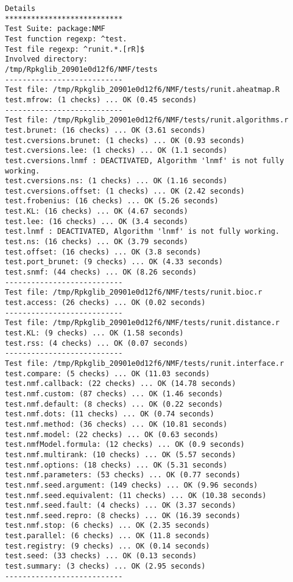 \documentclass[10pt]{article}\usepackage[]{graphicx}\usepackage[]{color}
\begin{document}
\begin{verbatim}
Details 
*************************** 
Test Suite: package:NMF 
Test function regexp: ^test. 
Test file regexp: ^runit.*.[rR]$ 
Involved directory: 
/tmp/Rpkglib_20901e0d12f6/NMF/tests 
--------------------------- 
Test file: /tmp/Rpkglib_20901e0d12f6/NMF/tests/runit.aheatmap.R 
test.mfrow: (1 checks) ... OK (0.45 seconds)
--------------------------- 
Test file: /tmp/Rpkglib_20901e0d12f6/NMF/tests/runit.algorithms.r 
test.brunet: (16 checks) ... OK (3.61 seconds)
test.cversions.brunet: (1 checks) ... OK (0.93 seconds)
test.cversions.lee: (1 checks) ... OK (1.1 seconds)
test.cversions.lnmf : DEACTIVATED, Algorithm 'lnmf' is not fully working.
test.cversions.ns: (1 checks) ... OK (1.16 seconds)
test.cversions.offset: (1 checks) ... OK (2.42 seconds)
test.frobenius: (16 checks) ... OK (5.26 seconds)
test.KL: (16 checks) ... OK (4.67 seconds)
test.lee: (16 checks) ... OK (3.4 seconds)
test.lnmf : DEACTIVATED, Algorithm 'lnmf' is not fully working.
test.ns: (16 checks) ... OK (3.79 seconds)
test.offset: (16 checks) ... OK (3.8 seconds)
test.port_brunet: (9 checks) ... OK (4.33 seconds)
test.snmf: (44 checks) ... OK (8.26 seconds)
--------------------------- 
Test file: /tmp/Rpkglib_20901e0d12f6/NMF/tests/runit.bioc.r 
test.access: (26 checks) ... OK (0.02 seconds)
--------------------------- 
Test file: /tmp/Rpkglib_20901e0d12f6/NMF/tests/runit.distance.r 
test.KL: (9 checks) ... OK (1.58 seconds)
test.rss: (4 checks) ... OK (0.07 seconds)
--------------------------- 
Test file: /tmp/Rpkglib_20901e0d12f6/NMF/tests/runit.interface.r 
test.compare: (5 checks) ... OK (11.03 seconds)
test.nmf.callback: (22 checks) ... OK (14.78 seconds)
test.nmf.custom: (87 checks) ... OK (1.46 seconds)
test.nmf.default: (8 checks) ... OK (0.22 seconds)
test.nmf.dots: (11 checks) ... OK (0.74 seconds)
test.nmf.method: (36 checks) ... OK (10.81 seconds)
test.nmf.model: (22 checks) ... OK (0.63 seconds)
test.nmfModel.formula: (12 checks) ... OK (0.9 seconds)
test.nmf.multirank: (10 checks) ... OK (5.57 seconds)
test.nmf.options: (18 checks) ... OK (5.31 seconds)
test.nmf.parameters: (53 checks) ... OK (0.77 seconds)
test.nmf.seed.argument: (149 checks) ... OK (9.96 seconds)
test.nmf.seed.equivalent: (11 checks) ... OK (10.38 seconds)
test.nmf.seed.fault: (4 checks) ... OK (3.37 seconds)
test.nmf.seed.repro: (8 checks) ... OK (16.39 seconds)
test.nmf.stop: (6 checks) ... OK (2.35 seconds)
test.parallel: (6 checks) ... OK (11.8 seconds)
test.registry: (9 checks) ... OK (0.14 seconds)
test.seed: (33 checks) ... OK (0.13 seconds)
test.summary: (3 checks) ... OK (2.95 seconds)
--------------------------- 

\end{verbatim}
\end{document}
